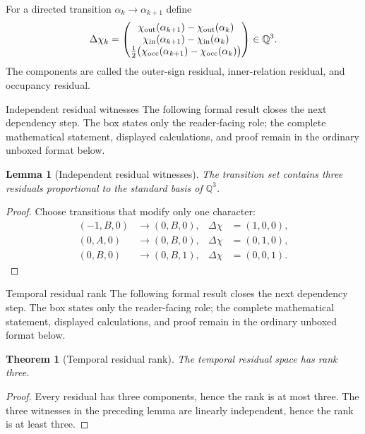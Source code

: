 \documentclass[11pt]{article}
\numberwithin{equation}{section}
\newtheorem{lemma}[definition]{Lemma}
\newtheorem{theorem}[definition]{Theorem}
\theoremstyle{remark}
\newcommand{\Q}{\mathbb{Q}}
\begin{document}
For a directed transition $\alpha_k\to\alpha_{k+1}$ define
\begin{equation}
\Delta\chi_k=
\begin{pmatrix}
\chi_{\rm out}(\alpha_{k+1})-\chi_{\rm out}(\alpha_k)\\
\chi_{\rm in}(\alpha_{k+1})-\chi_{\rm in}(\alpha_k)\\
\frac12\bigl(\chi_{\rm occ}(\alpha_{k+1})-\chi_{\rm occ}(\alpha_k)\bigr)
\end{pmatrix}
\in\Q^3.
\end{equation}
The components are called the outer-sign residual, inner-relation residual, and occupancy residual.

\begin{proofguide}{Independent residual witnesses}
The following formal result closes the next dependency step. The box states only the reader-facing role; the complete mathematical statement, displayed calculations, and proof remain in the ordinary unboxed format below.
\end{proofguide}
\begin{lemma}[Independent residual witnesses]
The transition set contains three residuals proportional to the standard basis of $\Q^3$.
\end{lemma}
\begin{proof}
Choose transitions that modify only one character:
\begin{align}
(-1,B,0)&\to(0,B,0),&\Delta\chi&=(1,0,0),\\
(0,A,0)&\to(0,B,0),&\Delta\chi&=(0,1,0),\\
(0,B,0)&\to(0,B,1),&\Delta\chi&=(0,0,1).
\end{align}
\end{proof}

\begin{proofguide}{Temporal residual rank}
The following formal result closes the next dependency step. The box states only the reader-facing role; the complete mathematical statement, displayed calculations, and proof remain in the ordinary unboxed format below.
\end{proofguide}
\begin{theorem}[Temporal residual rank]
The temporal residual space has rank three.
\end{theorem}
\begin{proof}
Every residual has three components, hence the rank is at most three. The three witnesses in the preceding lemma are linearly independent, hence the rank is at least three.
\end{proof}
\end{document}
